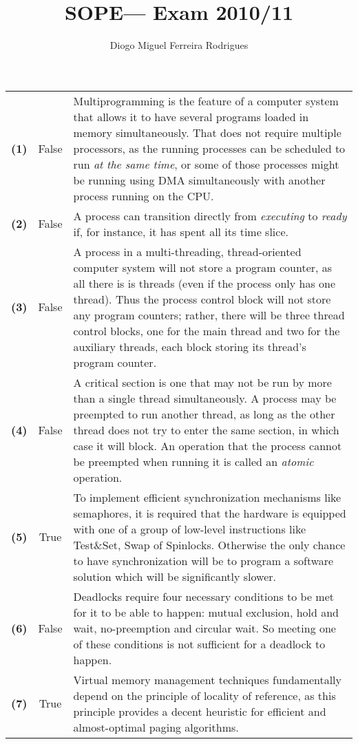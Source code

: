 \documentclass{sope}
\title{SOPE--- Exam 2010/11}
\author{Diogo Miguel Ferreira Rodrigues \\ \email{dmfrodrigues2000@gmail.com}}
\begin{document}
\setcounter{chapter}{10}
\begin{center} 
    \begin{longtable}{c | c p{132mm}}
        \textbf{(1)} & False & Multiprogramming is the feature of a computer system that allows it to have several programs loaded in memory simultaneously. That does not require multiple processors, as the running processes can be scheduled to run \emph{at the same time}, or some of those processes might be running using DMA simultaneously with another process running on the CPU. \\
        \textbf{(2)} & False & A process can transition directly from \emph{executing} to \emph{ready} if, for instance, it has spent all its time slice. \\
        \textbf{(3)} & False & A process in a multi-threading, thread-oriented computer system will not store a program counter, as all there is is threads (even if the process only has one thread). Thus the process control block will not store any program counters; rather, there will be three thread control blocks, one for the main thread and two for the auxiliary threads, each block storing its thread's program counter. \\
        \textbf{(4)} & False & A critical section is one that may not be run by more than a single thread simultaneously. A process may be preempted to run another thread, as long as the other thread does not try to enter the same section, in which case it will block. An operation that the process cannot be preempted when running it is called an \emph{atomic} operation. \\
        \textbf{(5)} & True & To implement efficient synchronization mechanisms like semaphores, it is required that the hardware is equipped with one of a group of low-level instructions like Test\&Set, Swap of Spinlocks. Otherwise the only chance to have synchronization will be to program a software solution which will be significantly slower. \\
        \textbf{(6)} & False & Deadlocks require four necessary conditions to be met for it to be able to happen: mutual exclusion, hold and wait, no-preemption and circular wait. So meeting one of these conditions is not sufficient for a deadlock to happen. \\
        \textbf{(7)} & True & Virtual memory management techniques fundamentally depend on the principle of locality of reference, as this principle provides a decent heuristic for efficient and almost-optimal paging algorithms. \\

\end{longtable}
\end{center}
\end{document}
